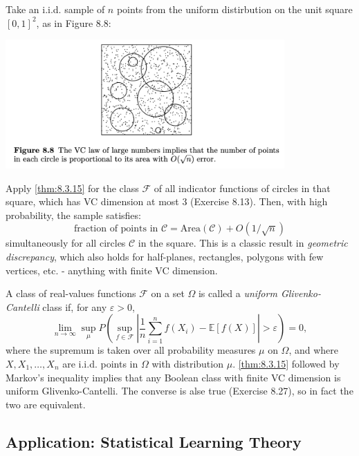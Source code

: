 \begin{example}[Discrepancy]
\label{ex:8.3.18}
Take an i.i.d. sample of $n$ points from the uniform distirbution on the unit square $[0, 1]^2$, as in Figure 
8.8:
\begin{center}
    \includegraphics[width=0.8\textwidth]{Chapter 8/fig8-8.png}
\end{center}

Apply \cref{thm:8.3.15} for the class $\mathcal{F}$ of all indicator functions of circles in that square, which 
has VC dimension at most 3 (Exercise 8.13). Then, with high probability, the sample satisfies:
\[ \text{fraction of points in } \mathcal{C} = \mathrm{Area}(\mathcal{C}) + O(1 / \sqrt{n}) \]
simultaneously for all circles $\mathcal{C}$ in the square. This is a classic result in \textit{geometric 
discrepancy}, which also holds for half-planes, rectangles, polygons with few vertices, etc. - anything with 
finite VC dimension.
\end{example}

\begin{remark}
\label{rmk:8.3.19}
A class of real-values functions $\mathcal{F}$ on a set $\Omega$ is called a \textit{uniform Glivenko-Cantelli} 
class if, for any $\varepsilon > 0$, 
\[ \lim_{n \to \infty} \sup_{\mu} P \left( \sup_{f \in \mathcal{F}} \left| \frac{1}{n} \sum_{i = 1}^{n} 
f(X_i) - \mathbb{E}\left[ f(X) \right] \right| > \varepsilon \right) = 0, \]
where the supremum is taken over all probability measures $\mu$ on $\Omega$, and where $X, X_1, \dots, X_n$ 
are i.i.d. points in $\Omega$ with distribution $\mu$. \cref{thm:8.3.15} followed by Markov's inequality implies 
that any Boolean class with finite VC dimension is uniform Glivenko-Cantelli. The converse is alse true 
(Exercise 8.27), so in fact the two are equivalent.
\end{remark}



\subsection{Application: Statistical Learning Theory}



